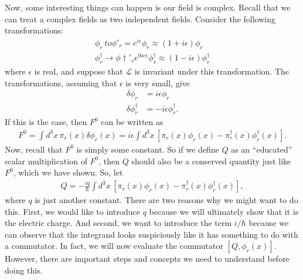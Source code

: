 \documentclass{book}
\numberwithin{equation}{section}
\theoremstyle{definition}
\newcommand{\lag}{\mathcal{L}}
\begin{document}
Now, some interesting things can happen is our field is complex. Recall that we can treat a complex fields as two independent fields. Consider the following transformations:
\begin{align}
\phi_r\ to \phi'_r = e^{i\epsilon}\phi_r \approx (1 + i\epsilon)\phi_r\\
\phi^\dagger_r \to \phi\dagger'_r e^{0ie\epsilon}\phi^\dagger_r \approx (1-i\epsilon)\phi^\dagger_r
\end{align}
where $\epsilon$ is real, and suppose that $\lag$ is invariant under this transformation. The transformations, assuming that $\epsilon$ is very small, give
\begin{align}
\delta \phi_r &= i\epsilon\phi_r\\
\delta \phi^\dagger_r &= -i\epsilon\phi^\dagger_r.
\end{align}
If this is the case, then $F^0$ can be written as
\begin{align}
F^0 = \int d^3x\, \pi_r(x)\delta \phi_r(x) = i\epsilon\int d^3x\, [\pi_r(x)\phi_r(x) - \pi_r^\dagger(x) \phi^\dagger_r(x)].
\end{align}
Now, recall that $F^0$ is simply some constant. So if we define $Q$ as an ``educated'' scalar multiplication of $F^0$, then $Q$ should also be a conserved quantity just like $F^0$, which we have shown. So, let 
\begin{align}
Q = -\frac{iq}{\hbar}\int d^3x\, [\pi_r(x)\phi_r(x) - \pi_r^\dagger(x) \phi^\dagger_r(x)],
\end{align}
where $q$ is just another constant. There are two reasons why we might want to do this. First, we would like to introduce $q$ because we will ultimately show that it is the electric charge. And second, we want to introduce the term $i/\hbar$ because we can observe that the integrand looks suspiciously like it has something to do with a commutator. In fact, we will now evaluate the commutator $[Q,\phi_r(x)]$. However, there are important steps and concepts we need to understand before doing this.\\
\end{document}
